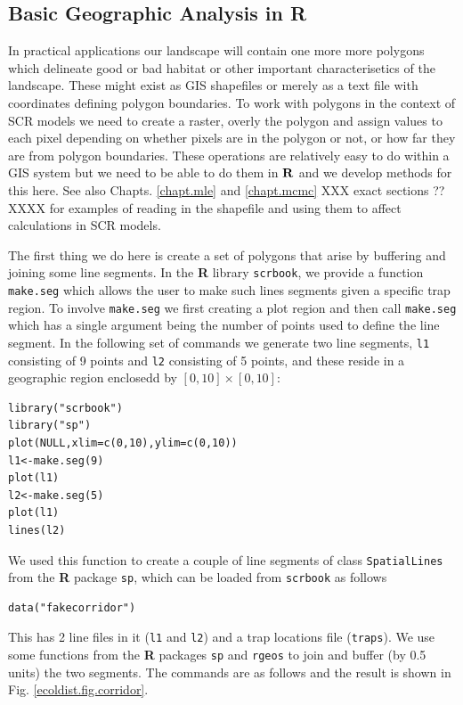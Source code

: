 \subsection{Basic Geographic Analysis in R}

In practical applications our landscape will contain one more more
polygons which delineate good or bad habitat or other important
characterisetics of the landscape.  These might exist as GIS
shapefiles or merely as a text file with coordinates defining polygon
boundaries. To work with polygons in the context of SCR models we need
to create a raster, overly the polygon and assign values to each pixel
depending on whether pixels are in the polygon or not, or how far they
are from polygon boundaries. These operations are relatively easy to
do within a GIS system but we need to be able to do them in ${\bf R}$
and we develop methods for this here.  See also
Chapts. \ref{chapt.mle} and \ref{chapt.mcmc} XXX exact sections ??
XXXX for examples of reading in the shapefile and using them to affect
calculations in SCR models.

The first thing we do here is create a set of polygons that arise by
buffering and joining some line segments.
In the {\bf R} library \mbox{\tt scrbook}, we provide 
 a function \mbox{\tt make.seg} which allows the user to make such
 lines segments given a 
specific trap region.  To involve \mbox{\tt make.seg} we first
creating a plot region and then call \mbox{\tt make.seg} which has a
single argument being the number of points used to define the line
segment. In the following set of commands we generate two line
segments, \mbox{\tt l1} consisting of 9 points and \mbox{\tt l2}
consisting of 5 points, and these reside in a geographic region
enclosedd by $[0,10] \times [0,10]$:
{\small 
\begin{verbatim}
library("scrbook")
library("sp")
plot(NULL,xlim=c(0,10),ylim=c(0,10))
l1<-make.seg(9)
plot(l1)
l2<-make.seg(5)
plot(l1)
lines(l2)
\end{verbatim}
}

We used this function to create a couple of line segments of class
\mbox{\tt SpatialLines} from the {\bf R} package \mbox{\tt sp}, which
can be loaded from \mbox{\tt scrbook} as  follows
\begin{verbatim}
data("fakecorridor")
\end{verbatim}
This has 2 line files in it (\mbox{\tt l1} and \mbox{\tt l2}) and a
trap locations file (\mbox{\tt traps}). 
We use some functions from the {\bf R} packages \mbox{\tt sp} and
\mbox{\tt rgeos} to join and 
buffer (by 0.5 units) the two segments. The commands are as follows
and the result is shown in Fig. \ref{ecoldist.fig.corridor}.

